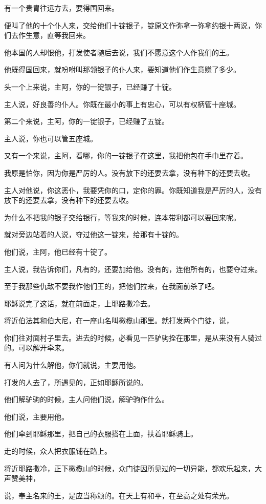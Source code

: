 \documentclass[12pt,oneside]{book}
\begin{document}
有一个贵胄往远方去，要得国回来。

便叫了他的十个仆人来，交给他们十锭银子，锭原文作弥拿一弥拿约银十两说，你们去作生意，直等我回来。

他本国的人却恨他，打发使者随后去说，我们不愿意这个人作我们的王。

他既得国回来，就吩咐叫那领银子的仆人来，要知道他们作生意赚了多少。

头一个上来说，主阿，你的一锭银子，已经赚了十锭。

主人说，好良善的仆人。你既在最小的事上有忠心，可以有权柄管十座城。

第二个来说，主阿，你的一锭银子，已经赚了五锭。

主人说，你也可以管五座城。

又有一个来说，主阿，看哪，你的一锭银子在这里，我把他包在手巾里存着。

我原是怕你，因为你是严厉的人。没有放下的还要去拿，没有种下的还要去收。

主人对他说，你这恶仆，我要凭你的口，定你的罪。你既知道我是严厉的人，没有放下的还要去拿，没有种下的还要去收。

为什么不把我的银子交给银行，等我来的时候，连本带利都可以要回来呢。

就对旁边站着的人说，夺过他这一锭来，给那有十锭的。

他们说，主阿，他已经有十锭了。

主人说，我告诉你们，凡有的，还要加给他。没有的，连他所有的，也要夺过来。

至于我那些仇敌不要我作他们王的，把他们拉来，在我面前杀了吧。

耶稣说完了这话，就在前面走，上耶路撒冷去。

将近伯法其和伯大尼，在一座山名叫橄榄山那里。就打发两个门徒，说，

你们往对面村子里去。进去的时候，必看见一匹驴驹拴在那里，是从来没有人骑过的。可以解开牵来。

有人问为什么解他，你们就说，主要用他。

打发的人去了，所遇见的，正如耶稣所说的。

他们解驴驹的时候，主人问他们说，解驴驹作什么。

他们说，主要用他。

他们牵到耶稣那里，把自己的衣服搭在上面，扶着耶稣骑上。

走的时候，众人把衣服铺在路上。

将近耶路撒冷，正下橄榄山的时候，众门徒因所见过的一切异能，都欢乐起来，大声赞美神，

说，奉主名来的王，是应当称颂的。在天上有和平，在至高之处有荣光。
\end{document}
